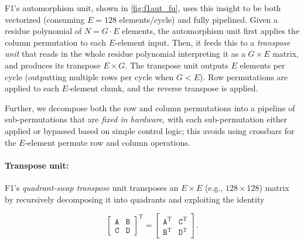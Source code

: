 \figFOneautfu

F1's automorphism unit, shown in \autoref{fig:f1aut_fu}, uses this insight to be
both vectorized (consuming $E=128$ elements/cycle) and fully pipelined. Given a
residue polynomial of $N=G\cdot E$ elements, the automorphism unit first
applies the column permutation to each $E$-element input. Then, it feeds this
to a \emph{transpose unit} that reads in the whole residue polynomial
interpreting it as a $G\times E$ matrix, and produces its transpose $E\times
G$. The transpose unit outputs $E$ elements per cycle (outputting multiple rows
per cycle when $G < E$). Row permutations are applied to each $E$-element
chunk, and the reverse transpose is applied.

Further, we decompose both the row and column permutations into a pipeline of
sub-permutations that are \textit{fixed in hardware}, with each sub-permutation
either applied or bypassed based on simple control logic; this avoids using
crossbars for the $E$-element permute row and column operations.

\figFOneQuadrantSwap

\paragraph{Transpose unit:}
F1's \textit{quadrant-swap transpose} unit transposes an $E \times E$ (e.g.,
$128\times 128$) matrix by recursively decomposing it into quadrants and
exploiting the identity

\begin{equation*}
  \left[ \begin{array}{c|c}
      \texttt{A} & \texttt{B}\\
      \hline
      \texttt{C} & \texttt{D}
  \end{array}\right]^{\textrm{T}} =   \left[ \begin{array}{c|c}
      \texttt{A}^{\textrm{T}} & \texttt{C}^{\textrm{T}} \\
      \hline
      \texttt{B}^{\textrm{T}} & \texttt{D}^{\textrm{T}}
  \end{array}\right].
\end{equation*}

